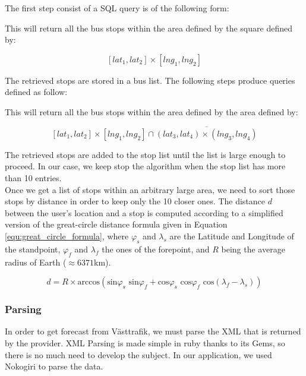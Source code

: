 The first step consist of a SQL query is of the following form:

\parbox{15cm}{

}

This will return all the bus stops within the area defined by the square defined by:

\[ [lat_1, lat_2]\times[lng_1, lng_2] \]

The retrieved stops are stored in a bus list. The following steps produce queries defined as follow:

\parbox{15cm}{

}

This will return all the bus stops within the area defined by the area defined by:

\[ [lat_1, lat_2]\times[lng_1, lng_2]\cap\overline{(lat_3, lat_4)\times(lng_3, lng_4)} \]

The retrieved stops are added to the stop list until the list is large enough to proceed. In our case, we keep stop the algorithm when the stop list has more than 10 entries.\\

Once we get a list of stops within an arbitrary large area, we need to sort those stops by distance in order to keep only the 10 closer ones. The distance $d$ between the user's location and a stop is computed according to a simplified version of the great-circle distance formula given in Equation \ref{equ:great_circle_formula}, where $\varphi_s$ and $\lambda_s$ are the Latitude and Longitude of the standpoint, $\varphi_f$ and $\lambda_f$ the ones of the forepoint, and $R$ being the average radius of Earth ($\approx6371$km).

\begin{equation}
\label{equ:great_circle_formula}
d =  R \times \textrm{arccos}\left(\textrm{sin}\varphi_s \textrm{ sin}\varphi_f + \textrm{cos}\varphi_s \textrm{ cos}\varphi_f \textrm{ cos}(\lambda_f-\lambda_s)\right)
\end{equation}

\subsubsection{Parsing}

In order to get forecast from Västtrafik, we must parse the XML that is returned by the provider. XML Parsing is made simple in ruby thanks to its Gems, so there is no much need to develop the subject. In our application, we used Nokogiri \cite{Nok10} to parse the data.\\

